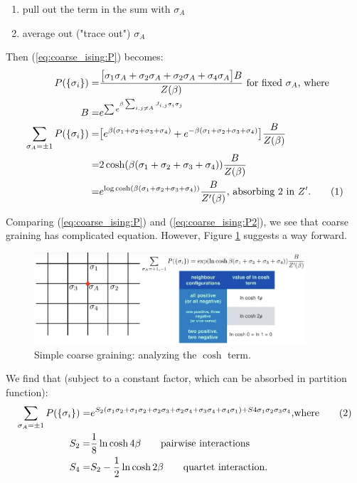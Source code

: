 \documentclass[]{article}
\newcommand\numberthis{\addtocounter{equation}{1}\tag{\theequation}}
\begin{document}
\begin{enumerate}
	\item pull out the term in the sum with $\sigma_A$
	\item average out ("trace out") $\sigma_A$
\end{enumerate}
Then (\ref{eq:coarse_ising:P}) becomes:
\begin{align*}
P(\{\sigma_i\}) =& \frac{\big[\sigma_1\sigma_A + \sigma_2\sigma_A + \sigma_2\sigma_A + \sigma_4\sigma_A\big]B}{Z(\beta)} \text{ for fixed $\sigma_A$, where}\\
B =& e^{\sum e^{\beta \sum_{i,j \ne A} J_{i,j} \sigma_i \sigma_j}}\\
\sum_{\sigma_A=\pm 1} P(\{\sigma_i\}) =& \big[e^{\beta(\sigma_1+\sigma_2+\sigma_3+\sigma_4)} + e^{-\beta(\sigma_1+\sigma_2+\sigma_3+\sigma_4)}\big]  \frac{B}{Z(\beta)}\\
=& 2 \cosh({\beta(\sigma_1+\sigma_2+\sigma_3+\sigma_4)})   \frac{B}{Z(\beta)}\\
=& e^{\log{\cosh({\beta(\sigma_1+\sigma_2+\sigma_3+\sigma_4)})}} \frac{B}{Z^\prime(\beta)} \text{, absorbing $2$ in $Z^{\prime}$.} \numberthis \label{eq:coarse_ising:P2}
\end{align*}

Comparing (\ref{eq:coarse_ising:P}) and (\ref{eq:coarse_ising:P2}), we see that coarse graining has complicated equation. However, Figure \ref{fig:ising-cosh} suggests a way forward.

\begin{figure}[H]
	\caption{Simple coarse graining: analyzing the $\cosh$ term.}\label{fig:ising-cosh}
	\includegraphics[width=0.9\textwidth]{ising-cosh}
\end{figure}

We find that (subject to a constant factor, which can be absorbed in partition function):
\begin{align*}
\sum_{\sigma_A=\pm 1} P(\{\sigma_i\}) =&e^{S_2 (\sigma_1\sigma_2 + \sigma_1\sigma_2+ \sigma_2\sigma_3 + \sigma_2 \sigma_4 + \sigma_3 \sigma_4 +\sigma_4 \sigma_1) + S4 \sigma_1 \sigma_2 \sigma_3 \sigma_4} \text{,where} \numberthis \label{eq:coupled:sigmas}\\
S_2 =& \frac{1}{8} \ln{\cosh{4\beta}} \tag*{pairwise interactions}\\
S_4 =& S_2 - \frac{1}{2} \ln{\cosh{2\beta}} \tag*{quartet interaction.}
\end{align*}
\end{document}
